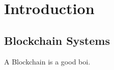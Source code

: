 \chapter{Introduction}


 


\label{ch-1}


\section{Blockchain Systems}



A Blockchain is a good boi.
